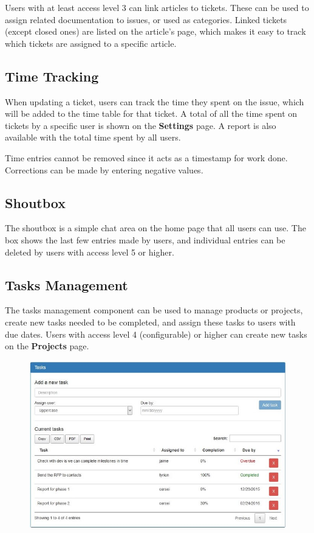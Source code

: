 \documentclass[11pt]{article}
\begin{document}
Users with at least access level 3 can link articles to tickets. These can be used to assign related documentation to issues, or used as categories. Linked tickets (except closed ones) are listed on the article's page, which makes it easy to track which tickets are assigned to a specific article.

\subsection{Time Tracking}
When updating a ticket, users can track the time they spent on the issue, which will be added to the time table for that ticket. A total of all the time spent on tickets by a specific user is shown on the \textbf{Settings} page. A report is also available with the total time spent by all users.

Time entries cannot be removed since it acts as a timestamp for work done. Corrections can be made by entering negative values.

\subsection{Shoutbox}
The shoutbox is a simple chat area on the home page that all users can use. The box shows the last few entries made by users, and individual entries can be deleted by users with access level 5 or higher.

\subsection{Tasks Management}
The tasks management component can be used to manage products or projects, create new tasks needed to be completed, and assign these tasks to users with due dates. Users with access level 4 (configurable) or higher can create new tasks on the \textbf{Projects} page.

\begin{figure}[h]
\includegraphics{projectmanagement.jpg}
\end{figure}
\end{document}
